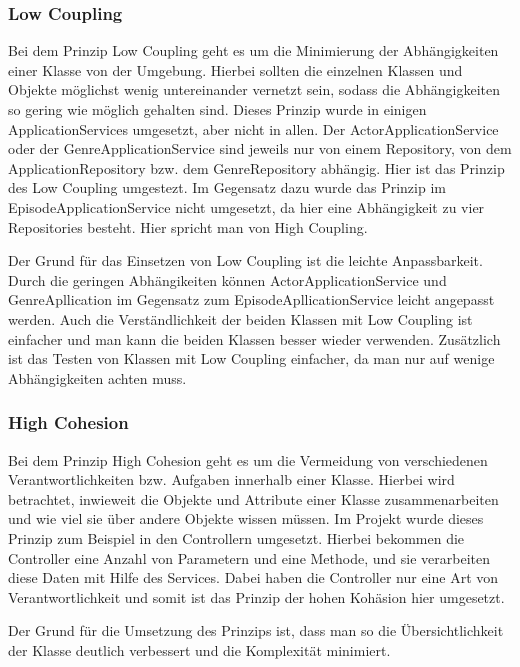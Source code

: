 		\subsubsection{Low Coupling}
			Bei dem Prinzip Low Coupling geht es um die Minimierung der Abhängigkeiten einer Klasse von der Umgebung. Hierbei sollten die einzelnen Klassen und Objekte möglichst wenig untereinander vernetzt sein, sodass die Abhängigkeiten so gering wie möglich gehalten sind. Dieses Prinzip wurde in einigen ApplicationServices umgesetzt, aber nicht in allen. Der ActorApplicationService oder der GenreApplicationService sind jeweils nur von einem Repository, von dem ApplicationRepository bzw. dem GenreRepository abhängig. Hier ist das Prinzip des Low Coupling umgestezt. Im Gegensatz dazu wurde das Prinzip im EpisodeApplicationService nicht umgesetzt, da hier eine Abhängigkeit zu vier Repositories besteht. Hier spricht man von High Coupling.
			
			Der Grund für das Einsetzen von Low Coupling ist die leichte Anpassbarkeit. Durch die geringen Abhängikeiten können ActorApplicationService und GenreApllication im Gegensatz zum EpisodeApllicationService leicht angepasst werden. Auch die Verständlichkeit der beiden Klassen mit Low Coupling ist einfacher und man kann die beiden Klassen besser wieder verwenden. Zusätzlich ist das Testen von Klassen mit Low Coupling einfacher, da man nur auf wenige Abhängigkeiten achten muss.
		
		\subsubsection{High Cohesion}
			Bei dem Prinzip High Cohesion geht es um die Vermeidung von verschiedenen Verantwortlichkeiten bzw. Aufgaben innerhalb einer Klasse. Hierbei wird betrachtet, inwieweit die Objekte und Attribute einer Klasse zusammenarbeiten und wie viel sie über andere Objekte wissen müssen. Im Projekt wurde dieses Prinzip zum Beispiel in den Controllern umgesetzt. Hierbei bekommen die Controller eine Anzahl von Parametern und eine Methode, und sie verarbeiten diese Daten mit Hilfe des Services. Dabei haben die Controller nur eine Art von Verantwortlichkeit und somit ist das Prinzip der hohen Kohäsion hier umgesetzt.
			
			Der Grund für die Umsetzung des Prinzips ist, dass man so die Übersichtlichkeit der Klasse deutlich verbessert und die Komplexität minimiert.
			
